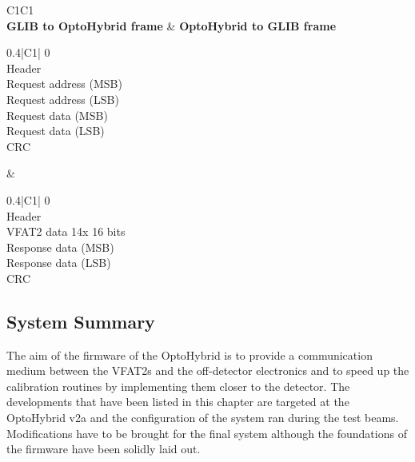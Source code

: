       \begin{table}[h!]
        \begin{tabularx}{\textwidth}{C{1}C{1}}
           \\
          \textbf{GLIB to OptoHybrid frame} & \textbf{OptoHybrid to GLIB frame} \\
          { \small
          \begin{tabularx}{0.4\textwidth}{|C{1}|}
             \hfill 0 \\ \hline
            Header \\ \hline
            Request address (MSB) \\ \hline
            Request address (LSB) \\ \hline
            Request data (MSB) \\ \hline
            Request data (LSB) \\ \hline
            CRC \\ \hline
          \end{tabularx} }
          &
          { \small
          \begin{tabularx}{0.4\textwidth}{|C{1}|}
             \hfill 0 \\ \hline
            Header \\ \hline
            VFAT2 data 14x 16 bits \\ \hline
            Response data (MSB) \\ \hline
            Response data (LSB) \\ \hline
            CRC \\ \hline
          \end{tabularx} }
        \end{tabularx}
        \caption{Format of the data packets used to communicate between the GLIB and OptoHybrid on the variable latency link.}
        \label{tab:II-3-data-format}
      \end{table}

    \subsection{System Summary}

      The aim of the firmware of the OptoHybrid is to provide a communication medium between the VFAT2s and the off-detector electronics and to speed up the calibration routines by implementing them closer to the detector. The developments that have been listed in this chapter are targeted at the OptoHybrid v2a and the configuration of the system ran during the test beams. Modifications have to be brought for the final system although the foundations of the firmware have been solidly laid out.

